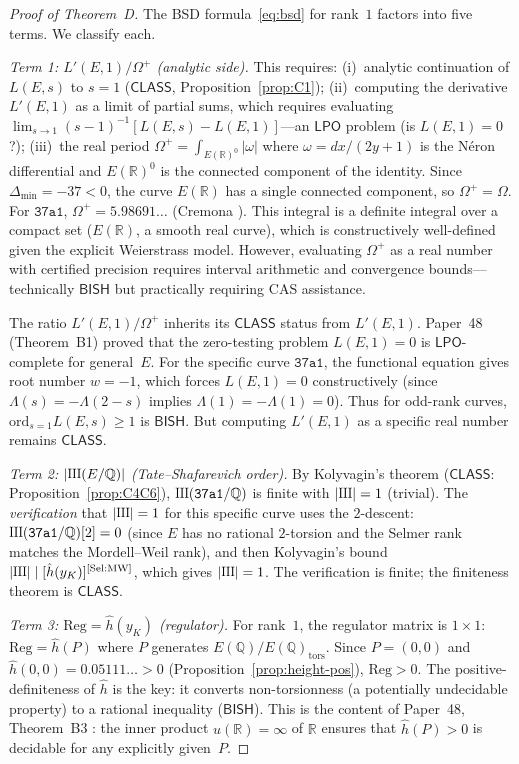 \documentclass[11pt]{article}
\theoremstyle{plain}
\theoremstyle{definition}
\theoremstyle{remark}
\newcommand{\Q}{\mathbb{Q}}
\newcommand{\R}{\mathbb{R}}
\newcommand{\Sha}{\text{\raisebox{0.05ex}{\scalebox{0.85}[1]{III}}}}
\newcommand{\ord}{\mathrm{ord}}
\newcommand{\Reg}{\mathrm{Reg}}
\newcommand{\BISH}{\ensuremath{\mathsf{BISH}}}
\newcommand{\LPO}{\ensuremath{\mathsf{LPO}}}
\newcommand{\CLASS}{\ensuremath{\mathsf{CLASS}}}
\newcommand{\hhat}{\hat{h}}
\begin{document}
\begin{proof}[Proof of Theorem~D]
The BSD formula~\eqref{eq:bsd} for rank~$1$ factors into five terms. We classify each.

\emph{Term 1: $L'(E,1)/\Omega^+$ (analytic side).}
This requires: (i)~analytic continuation of $L(E,s)$ to $s = 1$ ($\CLASS$, Proposition~\ref{prop:C1}); (ii)~computing the derivative $L'(E,1)$ as a limit of partial sums, which requires evaluating $\lim_{s \to 1}(s-1)^{-1}[L(E,s) - L(E,1)]$---an $\LPO$ problem (is $L(E,1) = 0$?); (iii)~the real period $\Omega^+ = \int_{E(\R)^0} |\omega|$ where $\omega = dx/(2y+1)$ is the N\'eron differential and $E(\R)^0$ is the connected component of the identity. Since $\Delta_{\min} = -37 < 0$, the curve $E(\R)$ has a single connected component, so $\Omega^+ = \Omega$. For $\texttt{37a1}$, $\Omega^+ = 5.98691\ldots$ (Cremona \cite{cremona}). This integral is a definite integral over a compact set ($E(\R)$, a smooth real curve), which is constructively well-defined given the explicit Weierstrass model. However, evaluating $\Omega^+$ as a real number with certified precision requires interval arithmetic and convergence bounds---technically $\BISH$ but practically requiring CAS assistance.

The ratio $L'(E,1)/\Omega^+$ inherits its $\CLASS$ status from $L'(E,1)$. Paper~48 (Theorem~B1) proved that the zero-testing problem $L(E,1) = 0$ is $\LPO$-complete for general~$E$. For the specific curve $\texttt{37a1}$, the functional equation gives root number $w = -1$, which forces $L(E,1) = 0$ constructively (since $\Lambda(s) = -\Lambda(2-s)$ implies $\Lambda(1) = -\Lambda(1) = 0$). Thus for odd-rank curves, $\ord_{s=1} L(E,s) \geq 1$ is $\BISH$. But computing $L'(E,1)$ as a specific real number remains $\CLASS$.

\emph{Term 2: $|\Sha(E/\Q)|$ (Tate--Shafarevich order).}
By Kolyvagin's theorem ($\CLASS$: Proposition~\ref{prop:C4C6}), $\Sha(\texttt{37a1}/\Q)$ is finite with $|\Sha| = 1$ (trivial). The \emph{verification} that $|\Sha| = 1$ for this specific curve uses the $2$-descent: $\Sha(\texttt{37a1}/\Q)[2] = 0$ (since $E$ has no rational $2$-torsion and the Selmer rank matches the Mordell--Weil rank), and then Kolyvagin's bound $|\Sha| \mid [\hat{h}(y_K)]^{[\text{Sel}:\text{MW}]}$, which gives $|\Sha| = 1$. The verification is finite; the finiteness theorem is $\CLASS$.

\emph{Term 3: $\Reg = \hhat(y_K)$ (regulator).}
For rank~$1$, the regulator matrix is $1 \times 1$: $\Reg = \hhat(P)$ where $P$ generates $E(\Q)/E(\Q)_{\mathrm{tors}}$. Since $P = (0,0)$ and $\hhat(0,0) = 0.05111\ldots > 0$ (Proposition~\ref{prop:height-pos}), $\Reg > 0$. The positive-definiteness of $\hhat$ is the key: it converts non-torsionness (a potentially undecidable property) to a rational inequality ($\BISH$). This is the content of Paper~48, Theorem~B3 \cite{paper48}: the inner product $u(\R) = \infty$ of $\R$ ensures that $\hhat(P) > 0$ is decidable for any explicitly given~$P$.


\end{proof}
\end{document}

